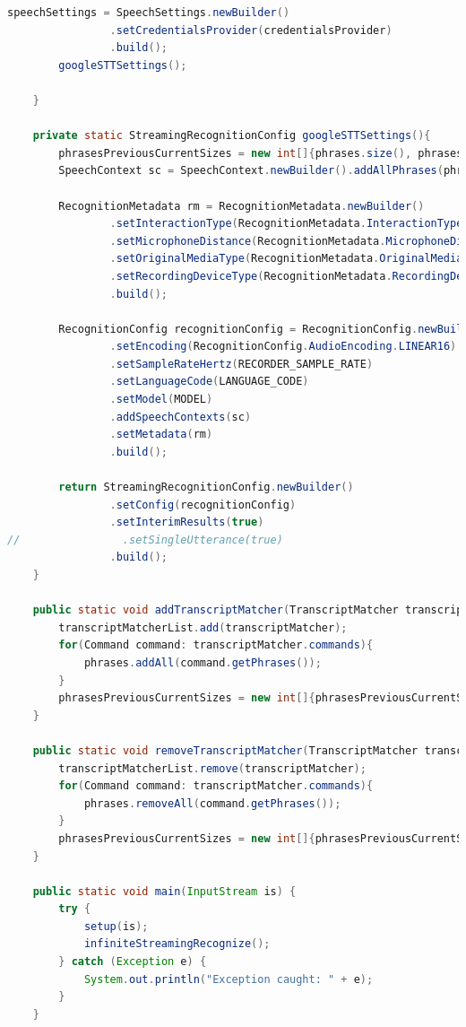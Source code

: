 \documentclass[oneside, 12pt]{book}
\begin{document}
\begin{center}
\begin{lstlisting}[language=java]
        speechSettings = SpeechSettings.newBuilder()
                .setCredentialsProvider(credentialsProvider)
                .build();
        googleSTTSettings();

    }

    private static StreamingRecognitionConfig googleSTTSettings(){
        phrasesPreviousCurrentSizes = new int[]{phrases.size(), phrases.size()};
        SpeechContext sc = SpeechContext.newBuilder().addAllPhrases(phrases).build();

        RecognitionMetadata rm = RecognitionMetadata.newBuilder()
                .setInteractionType(RecognitionMetadata.InteractionType.VOICE_COMMAND)
                .setMicrophoneDistance(RecognitionMetadata.MicrophoneDistance.NEARFIELD)
                .setOriginalMediaType(RecognitionMetadata.OriginalMediaType.AUDIO)
                .setRecordingDeviceType(RecognitionMetadata.RecordingDeviceType.SMARTPHONE)
                .build();

        RecognitionConfig recognitionConfig = RecognitionConfig.newBuilder()
                .setEncoding(RecognitionConfig.AudioEncoding.LINEAR16)
                .setSampleRateHertz(RECORDER_SAMPLE_RATE)
                .setLanguageCode(LANGUAGE_CODE)
                .setModel(MODEL)
                .addSpeechContexts(sc)
                .setMetadata(rm)
                .build();

        return StreamingRecognitionConfig.newBuilder()
                .setConfig(recognitionConfig)
                .setInterimResults(true)
//                .setSingleUtterance(true)
                .build();
    }

    public static void addTranscriptMatcher(TranscriptMatcher transcriptMatcher){
        transcriptMatcherList.add(transcriptMatcher);
        for(Command command: transcriptMatcher.commands){
            phrases.addAll(command.getPhrases());
        }
        phrasesPreviousCurrentSizes = new int[]{phrasesPreviousCurrentSizes[1], phrases.size()};
    }

    public static void removeTranscriptMatcher(TranscriptMatcher transcriptMatcher){
        transcriptMatcherList.remove(transcriptMatcher);
        for(Command command: transcriptMatcher.commands){
            phrases.removeAll(command.getPhrases());
        }
        phrasesPreviousCurrentSizes = new int[]{phrasesPreviousCurrentSizes[1], phrases.size()};
    }

    public static void main(InputStream is) {
        try {
            setup(is);
            infiniteStreamingRecognize();
        } catch (Exception e) {
            System.out.println("Exception caught: " + e);
        }
    }


\end{lstlisting}
\end{center}
\end{document}
